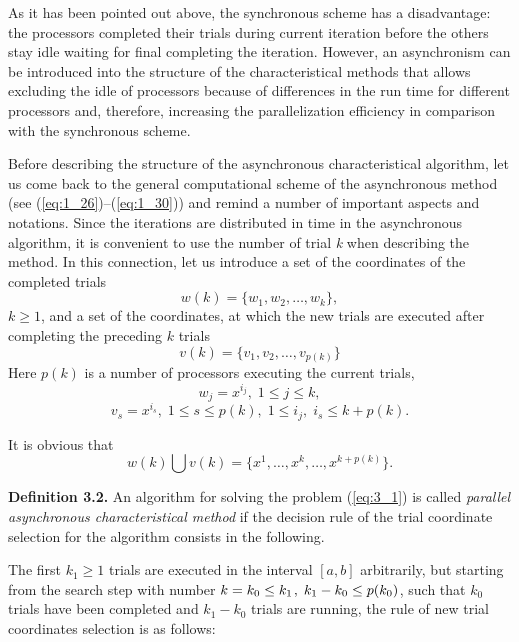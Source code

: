 	As it has been pointed out above, the synchronous scheme has a disadvantage: the processors completed their trials during current iteration before the others stay idle waiting for final completing the iteration. However, an asynchronism can be introduced into the structure of the characteristical methods that allows excluding the idle of processors because of differences in the run time for different processors and, therefore, increasing the parallelization efficiency in comparison with the synchronous scheme.
	
	Before describing the structure of the asynchronous characteristical algorithm, let us come back to the general computational scheme of the asynchronous method (see (\ref{eq:1_26})--(\ref{eq:1_30})) and remind a number of important aspects and notations. Since the iterations are distributed in time in the asynchronous algorithm, it is convenient to use the number of trial \textit{k} when describing the method. In this connection, let us introduce a set of the coordinates of the completed trials
	\begin{equation} 
	\label{eq:3_60} 
	w(k)=\{ w_{1} ,w_{2} ,\ldots ,w_{k} \} , 
	\end{equation} 
	$k\ge 1$, and a set of the coordinates, at which the new trials are executed after completing the preceding $k$ trials
	\begin{equation} 
	\label{eq:3_61} 
	v(k)=\{ v_{1} ,v_{2} ,\ldots ,v_{p(k)} \}  
	\end{equation} 
	Here $p(k)$ is a number of processors executing the current trials, 
	\begin{equation*}
	w_{j} =x^{i_{j} } ,\; 1\le j\le k,
	\end{equation*}
	\begin{equation*}
	v_{s} =x^{i_{s} } ,\; 1\le s\le p(k),\; 1\le i_{j} ,\; i_{s} \le k+p(k).
	\end{equation*}
	
	It is obvious that
	\begin{equation*}
	w(k)\bigcup v(k)=\{ x^{1} ,\ldots ,x^{k} ,\ldots ,x^{k+p(k)} \}.
	\end{equation*}
	
	\textbf{Definition 3.2.} An algorithm for solving the problem  (\ref{eq:3_1}) is called  \textit{parallel asynchronous characteristical method} if the decision rule of the trial coordinate selection for the algorithm consists in the following.
	
	The first $k_{1} \ge 1$ trials are executed in the interval $[a,b]$ arbitrarily, but starting from the search step with number $k=k_{0} \le k_{1} {\kern 1pt} ,\; k_{1} -k_{0} \le p(k_{0} )$, such that $k_{0} $ trials have been completed and $k_{1} -k_{0} $ trials are running, the rule of new trial coordinates selection is as follows:
	
